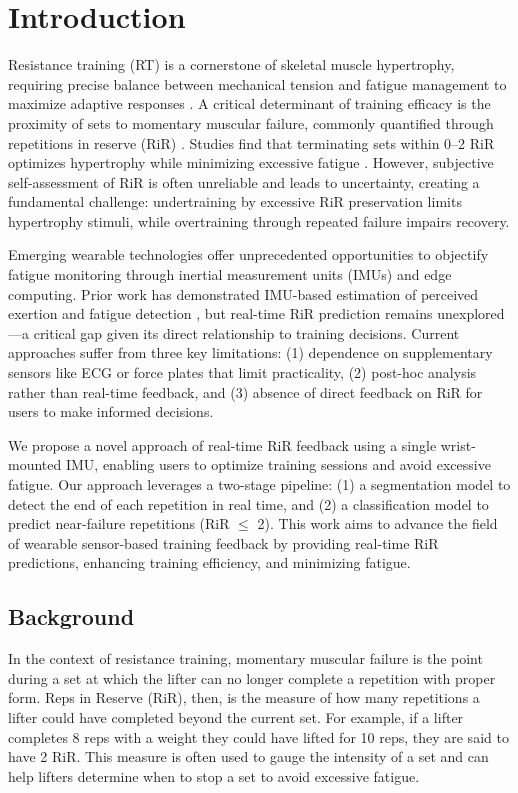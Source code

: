 \documentclass[conference]{IEEEtran}
\begin{document}
\section{Introduction}
Resistance training (RT) is a cornerstone of skeletal muscle hypertrophy, requiring precise balance between mechanical tension and fatigue management to maximize adaptive responses \cite{schoenfeld2010mechanisms}. A critical determinant of training efficacy is the proximity of sets to momentary muscular failure, commonly quantified through repetitions in reserve (RiR) \cite{refalo2024similar}. Studies find that terminating sets within 0--2 RiR optimizes hypertrophy while minimizing excessive fatigue \cite{refalo2024similar, izquierdo2006differential}. However, subjective self-assessment of RiR is often unreliable and leads to uncertainty, creating a fundamental challenge: undertraining by excessive RiR preservation limits hypertrophy stimuli, while overtraining through repeated failure impairs recovery.

Emerging wearable technologies offer unprecedented opportunities to objectify fatigue monitoring through inertial measurement units (IMUs) and edge computing. Prior work has demonstrated IMU-based estimation of perceived exertion \cite{albert2021using} and fatigue detection \cite{jiang2021data}, but real-time RiR prediction remains unexplored---a critical gap given its direct relationship to training decisions. Current approaches suffer from three key limitations: (1) dependence on supplementary sensors like ECG \cite{albert2021using} or force plates \cite{jiang2021data} that limit practicality, (2) post-hoc analysis rather than real-time feedback, and (3) absence of direct feedback on RiR for users to make informed decisions.

We propose a novel approach of real-time RiR feedback using a single wrist-mounted IMU, enabling users to optimize training sessions and avoid excessive fatigue. Our approach leverages a two-stage pipeline: (1) a segmentation model to detect the end of each repetition in real time, and (2) a classification model to predict near-failure repetitions (RiR $\leq$ 2). This work aims to advance the field of wearable sensor-based training feedback by providing real-time RiR predictions, enhancing training efficiency, and minimizing fatigue.

\subsection{Background}
In the context of resistance training, momentary muscular failure is the point during a set at which the lifter can no longer complete a repetition with proper form. Reps in Reserve (RiR), then, is the measure of how many repetitions a lifter could have completed beyond the current set. For example, if a lifter completes 8 reps with a weight they could have lifted for 10 reps, they are said to have 2 RiR. This measure is often used to gauge the intensity of a set and can help lifters determine when to stop a set to avoid excessive fatigue. 
\end{document}
